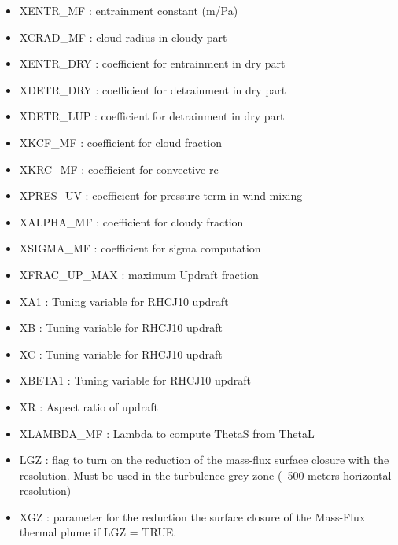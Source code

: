 \begin{itemize}
\item
{}
XENTR\_MF : entrainment constant (m/Pa)
\item
{}
XCRAD\_MF : cloud radius in cloudy part
\item
{}
XENTR\_DRY : coefficient for entrainment in dry part
\item
{}
XDETR\_DRY : coefficient for detrainment in dry part
\item
{}
XDETR\_LUP : coefficient for detrainment in dry part
\item
{}
XKCF\_MF : coefficient for cloud fraction
\item
{}
XKRC\_MF : coefficient for convective rc
{}
\item
{}
XPRES\_UV : coefficient for pressure term in wind mixing
\item
{}
XALPHA\_MF : coefficient for cloudy fraction
\item
{}
XSIGMA\_MF : coefficient for sigma computation
\item
{}
XFRAC\_UP\_MAX : maximum Updraft fraction
\item
{}
XA1 : Tuning variable for RHCJ10 updraft 
\item
{}
XB : Tuning variable for RHCJ10 updraft
\item
{}
XC : Tuning variable for RHCJ10 updraft
\item
{}
XBETA1 : Tuning variable for RHCJ10 updraft
\item
{}
XR : Aspect ratio of updraft
\item
{}
XLAMBDA\_MF : Lambda to compute ThetaS from ThetaL
\item
{}
LGZ : flag to turn on the reduction of the mass-flux surface closure with the resolution. Must be used in the turbulence grey-zone (~500 meters horizontal resolution)
\item
{}
XGZ : parameter for the reduction the surface closure of the Mass-Flux thermal plume if LGZ = TRUE.
\end{itemize}
